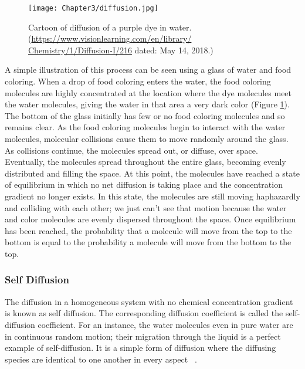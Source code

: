 \begin{figure}[h!]
\centering
\texttt{[image: Chapter3/diffusion.jpg]}
\caption[Cartoon of diffusion of a purple dye in water.]{Cartoon of diffusion of a purple dye in water. (\url{https://www.visionlearning.com/en/library/ Chemistry/1/Diffusion-I/216} dated: May 14, 2018.)}
    \label{diffusion} 
 \end{figure}
   A simple illustration of this process can be seen using a glass of water and food coloring. When a drop of food coloring enters the water, the food coloring molecules are highly concentrated at the location where the dye molecules meet the water molecules, giving the water in that area a very dark color (Figure \ref{diffusion}). The bottom of the glass initially has few or no food coloring molecules and so remains clear. As the food coloring molecules begin to interact with the water molecules, molecular collisions cause them to move randomly around the glass. As collisions continue, the molecules spread out, or diffuse, over space. Eventually, the molecules spread throughout the entire glass, becoming evenly distributed and filling the space. At this point, the molecules have reached a state of equilibrium in which no net diffusion is taking place and the concentration gradient no longer exists. In this state, the molecules are still moving haphazardly and colliding with each other; we just can't see that motion because the water and color molecules are evenly dispersed throughout the space. Once equilibrium has been reached, the probability that a molecule will move from the top to the bottom is equal to the probability a molecule will move from the bottom to the top.
     \subsubsection{Self Diffusion}
       The diffusion in a homogeneous system with no chemical concentration gradient is known as self diffusion. The corresponding diffusion coefficient is called the self-diffusion coefficient. For an instance, the water molecules even in pure water are in continuous random motion; their migration through the liquid is a perfect example of self-diffusion. It is a simple form of diffusion where the diffusing species are identical to one another in every aspect ~\citep{mehrer2009, heitjans2006}.
       
